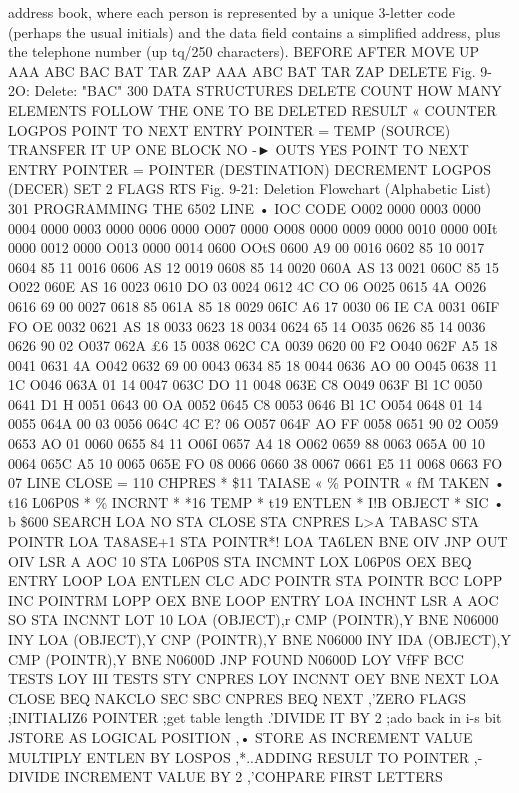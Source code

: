 \documentclass{book}
\begin{document}
{{{{{{{{{address book, where each person is represented by a unique
3-letter code (perhaps the usual initials) and the data field contains
a simplified address, plus the telephone number (up tq/250
characters).
BEFORE AFTER
MOVE UP
AAA
ABC
BAC
BAT
TAR
ZAP
AAA
ABC
BAT
TAR
ZAP
DELETE
Fig. 9-2O: Delete: "BAC"
300
DATA STRUCTURES
DELETE
COUNT HOW MANY
ELEMENTS FOLLOW THE
ONE TO BE DELETED
RESULT « COUNTER
LOGPOS
POINT TO NEXT ENTRY
POINTER = TEMP (SOURCE)
TRANSFER IT UP ONE BLOCK
NO
-► OUTS
YES
POINT TO NEXT ENTRY
POINTER = POINTER (DESTINATION)
DECREMENT LOGPOS
(DECER)
SET 2 FLAGS
RTS
Fig. 9-21: Deletion Flowchart (Alphabetic List)
301
PROGRAMMING THE 6502
LINE • IOC CODE
O002 0000
0003 0000
0004 0000
0003 0000
0006 0000
O007 0000
O008 0000
0009 0000
0010 0000
00It 0000
0012 0000
O013 0000
0014 0600
OOtS 0600 A9 00
0016 0602 85 10
0017 0604 85 11
0016 0606 AS 12
0019 0608 85 14
0020 060A AS 13
0021 060C 85 15
O022 060E AS 16
0023 0610 DO 03
0024 0612 4C CO 06
O025 0615 4A
O026 0616 69 00
0027 0618 85  061A 85 18
0029 06IC A6 17
0030 06 IE CA
0031 06IF FO OE
0032 0621 AS 18
0033 0623 18
0034 0624 65 14
O035 0626 85 14
0036 0626 90 02
O037 062A £6 15
0038 062C CA
0039 0620 00 F2
O040 062F A5 18
0041 0631 4A
O042 0632 69 00
0043 0634 85 18
0044 0636 AO 00
O045 0638 11 1C
O046 063A 01 14
0047 063C DO 11
0048 063E C8
O049 063F Bl 1C
0050 0641 D1 H
0051 0643 00 OA
0052 0645 C8
0053 0646 Bl 1C
O054 0648 01 14
0055 064A 00 03
0056 064C 4C E? 06
O057 064F AO FF
0058 0651 90 02
O059 0653 AO 01
0060 0655 84 11
O06I 0657 A4 18
O062 0659 88
0063 065A 00 10
0064 065C A5 10
0065 065E FO 08
0066 0660 38
0067 0661 E5 11
0068 0663 FO 07
LINE
CLOSE = 110
CHPRES * \$11
TAIASE « \%\2
POINTR « fM
TAKEN • t16
L06P0S * \%\7
INCRNT * *16
TEMP * t19
ENTLEN * I!B
OBJECT * SIC
• b \$600
SEARCH LOA NO
STA CLOSE
STA CNPRES
L>A TABASC
STA POINTR
LOA TA8ASE+1
STA POINTR*!
LOA TA6LEN
BNE OIV
JNP OUT
OIV LSR A
AOC 10
STA L06P0S
STA INCMNT
LOX L06P0S
OEX
BEQ ENTRY
LOOP LOA ENTLEN
CLC
ADC POINTR
STA POINTR
BCC LOPP
INC POINTRM
LOPP OEX
BNE LOOP
ENTRY LOA INCHNT
LSR A
AOC SO
STA INCNNT
LOT 10
LOA (OBJECT),r
CMP (POINTR),Y
BNE N06000
INY
LOA (OBJECT),Y
CNP (POINTR),Y
BNE N06000
INY
IDA (OBJECT),Y
CMP (POINTR),Y
BNE N0600D
JNP FOUND
N0600D LOY VfFF
BCC TESTS
LOY III
TESTS STY CNPRES
LOY INCNNT
OEY
BNE NEXT
LOA CLOSE
BEQ NAKCLO
SEC
SBC CNPRES
BEQ NEXT
,'ZERO FLAGS
;INITIALIZ6 POINTER
;get table length
.'DIVIDE IT BY 2
;ado back in i-s bit
JSTORE AS LOGICAL POSITION
,• STORE AS INCREMENT VALUE
MULTIPLY ENTLEN BY LOSPOS
,*..ADDING RESULT TO POINTER
,-DIVIDE INCREMENT VALUE BY 2
,'COHPARE FIRST LETTERS
}}}}}}}}}
\end{document}
